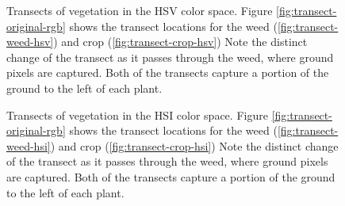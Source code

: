\documentclass[letterpaper]{report}
\begin{document}
\begin{figure}[h]
	\centering
	\hfill
	\hfill
	\caption[HSV Transects]{Transects of vegetation in the HSV color space. Figure \ref{fig:transect-original-rgb} shows the transect locations for the weed (\ref{fig:transect-weed-hsv}) and crop (\ref{fig:transect-crop-hsv}) Note the distinct change of the transect as it passes through the weed, where ground pixels are captured. Both of the transects capture a portion of the ground to the left of each plant.}
	\label{fig:transects-hsv}
\end{figure}

\begin{figure}[h]
	\centering
	\hfill
	\hfill
	\caption[HSI Transects]{Transects of vegetation in the HSI color space. Figure \ref{fig:transect-original-rgb} shows the transect locations for the weed (\ref{fig:transect-weed-hsi}) and crop (\ref{fig:transect-crop-hsi}) Note the distinct change of the transect as it passes through the weed, where ground pixels are captured. Both of the transects capture a portion of the ground to the left of each plant.}
	\label{fig:transects-hsv}
\end{figure}
\end{document}
